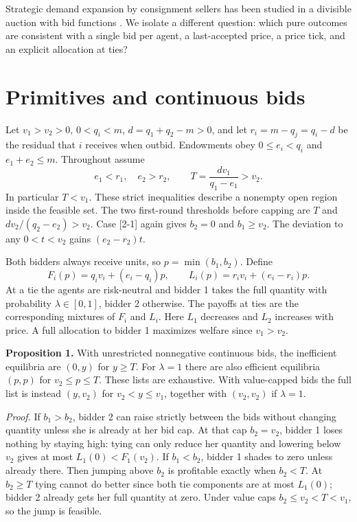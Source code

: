 \documentclass[11pt]{article}
\begin{document}
Strategic demand expansion by consignment sellers has been studied in a divisible auction with bid functions \cite{liu}. We isolate a different question: which pure outcomes are consistent with a single bid per agent, a last-accepted price, a price tick, and an explicit allocation at ties?
\newpage
\section{Primitives and continuous bids}
Let $v_1>v_2>0$, $0<q_i<m$, $d=q_1+q_2-m>0$, and let $r_i=m-q_j=q_i-d$ be the residual that $i$ receives when outbid. Endowments obey $0\le e_i<q_i$ and $e_1+e_2\le m$. Throughout assume
\[
 e_1<r_1,\quad e_2>r_2,\qquad T=\frac{d v_1}{q_1-e_1}>v_2.
\]
In particular $T<v_1$. These strict inequalities describe a nonempty open region inside the feasible set. The two first-round thresholds before capping are $T$ and $d v_2/(q_2-e_2)>v_2$. Case [2-1] again gives $b_2=0$ and $b_1\ge v_2$. The deviation to any $0<t<v_2$ gains $(e_2-r_2)t$.

Both bidders always receive units, so $p=\min(b_1,b_2)$. Define
\[
 F_i(p)=q_iv_i+(e_i-q_i)p,\qquad L_i(p)=r_iv_i+(e_i-r_i)p.
\]
At a tie the agents are risk-neutral and bidder 1 takes the full quantity with probability $\lambda\in[0,1]$, bidder 2 otherwise. The payoffs at ties are the corresponding mixtures of $F_i$ and $L_i$. Here $L_1$ decreases and $L_2$ increases with price. A full allocation to bidder 1 maximizes welfare since $v_1>v_2$.

\textbf{Proposition 1.} With unrestricted nonnegative continuous bids, the inefficient equilibria are $(0,y)$ for $y\ge T$. For $\lambda=1$ there are also efficient equilibria $(p,p)$ for $v_2\le p\le T$. These lists are exhaustive. With value-capped bids the full list is instead $(y,v_2)$ for $v_2<y\le v_1$, together with $(v_2,v_2)$ if $\lambda=1$.

\textit{Proof.} If $b_1>b_2$, bidder 2 can raise strictly between the bids without changing quantity unless she is already at her bid cap. At that cap $b_2=v_2$, bidder 1 loses nothing by staying high: tying can only reduce her quantity and lowering below $v_2$ gives at most $L_1(0)<F_1(v_2)$. If $b_1<b_2$, bidder 1 shades to zero unless already there. Then jumping above $b_2$ is profitable exactly when $b_2<T$. At $b_2\ge T$ tying cannot do better since both tie components are at most $L_1(0)$; bidder 2 already gets her full quantity at zero. Under value caps $b_2\le v_2<T<v_1$, so the jump is feasible.
\end{document}
